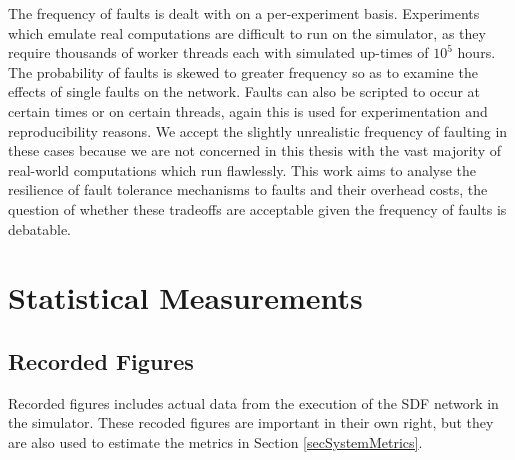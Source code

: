 The frequency of faults is dealt with on a per-experiment basis.
Experiments which emulate real computations are difficult to run on the simulator, as they require thousands of worker threads each with simulated up-times of $10^5$ hours.
The probability of faults is skewed to greater frequency so as to examine the effects of single faults on the network.
Faults can also be scripted to occur at certain times or on certain threads, again this is used for experimentation and reproducibility reasons.
We accept the slightly unrealistic frequency of faulting in these cases because we are not concerned in this thesis with the vast majority of real-world computations which run flawlessly.
This work aims to analyse the resilience of fault tolerance mechanisms to faults and their overhead costs, the question of whether these tradeoffs are acceptable given the frequency of faults is debatable.

\section{Statistical Measurements}
\label{secSystemStatistics}
\subsection{Recorded Figures}

Recorded figures includes actual data from the execution of the SDF network in the simulator.
These recoded figures are important in their own right, but they are also used to estimate the metrics in Section \ref{secSystemMetrics}.


